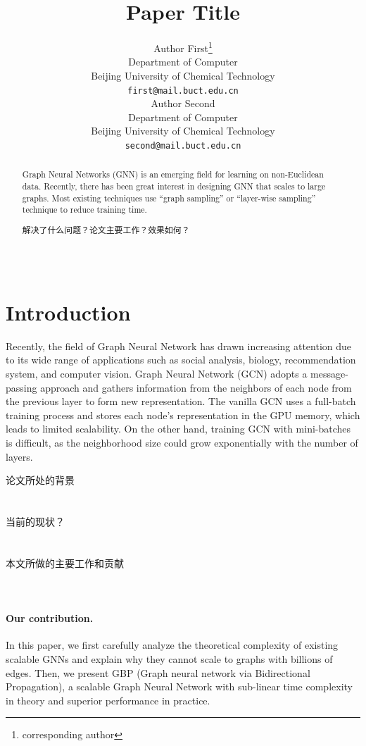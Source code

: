 \documentclass[UTF8]{article} %
\title{Paper Title}
\author{%
  Author First\thanks{corresponding author} \\
  Department of Computer \\
  Beijing University of Chemical Technology \\
  \texttt{first@mail.buct.edu.cn} \\
  \And
  Author Second \\  
  Department of Computer \\
  Beijing University of Chemical Technology \\
  \texttt{second@mail.buct.edu.cn} \\
}
\begin{document}
\maketitle

\begin{abstract}
Graph Neural Networks (GNN) is an emerging field for learning on non-Euclidean data. Recently, there has been great interest in designing GNN that scales to large graphs. Most existing techniques use ``graph sampling'' or ``layer-wise sampling'' technique to reduce training time. 

解决了什么问题？论文主要工作？效果如何？
~\\
~\\
~\\
\end{abstract}

\section{Introduction}
Recently, the field of Graph Neural Network has drawn increasing attention due to its wide range of applications such  as social analysis, biology, recommendation system, and computer vision. Graph Neural Network (GCN) adopts a message-passing approach and gathers information from the neighbors of each node from the previous layer to form new representation. The vanilla GCN uses a full-batch training process and stores each node's representation in the GPU memory, which leads to limited scalability. On the other hand, training GCN with mini-batches is difficult, as the neighborhood size could grow exponentially with the number of layers.

论文所处的背景
~\\
~\\
~\\


当前的现状？
~\\
~\\
~\\

本文所做的主要工作和贡献
~\\
~\\
~\\

\paragraph{Our contribution.} In this paper, we first carefully analyze the theoretical complexity of existing scalable GNNs and explain why they cannot scale to graphs with billions of edges. Then, we present GBP (Graph neural network via Bidirectional Propagation), a scalable Graph Neural Network with sub-linear time complexity in theory and superior performance in practice. 
\end{document}
